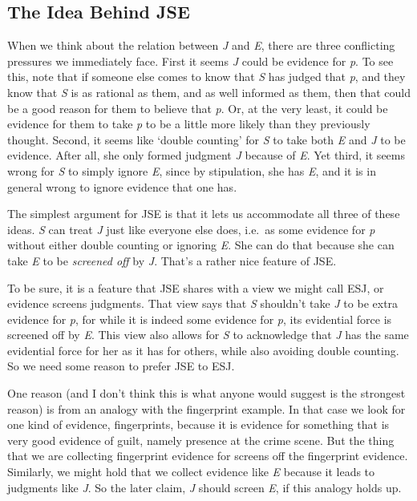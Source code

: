 \documentclass[
  11pt,
  letterpaper,
  DIV=11,
  numbers=noendperiod,
  twoside]{scrartcl}
\begin{document}
\subsection{The Idea Behind JSE}\label{the-idea-behind-jse}

When we think about the relation between \emph{J} and \emph{E}, there
are three conflicting pressures we immediately face. First it seems
\emph{J} could be evidence for \emph{p}. To see this, note that if
someone else comes to know that \emph{S} has judged that \emph{p}, and
they know that \emph{S} is as rational as them, and as well informed as
them, then that could be a good reason for them to believe that
\emph{p}. Or, at the very least, it could be evidence for them to take
\emph{p} to be a little more likely than they previously thought.
Second, it seems like `double counting' for \emph{S} to take both
\emph{E} and \emph{J} to be evidence. After all, she only formed
judgment \emph{J} because of \emph{E}. Yet third, it seems wrong for
\emph{S} to simply ignore \emph{E}, since by stipulation, she has
\emph{E}, and it is in general wrong to ignore evidence that one has.

The simplest argument for JSE is that it lets us accommodate all three
of these ideas. \emph{S} can treat \emph{J} just like everyone else
does, i.e.~as some evidence for \emph{p} without either double counting
or ignoring \emph{E}. She can do that because she can take \emph{E} to
be \emph{screened off} by \emph{J}. That's a rather nice feature of JSE.

To be sure, it is a feature that JSE shares with a view we might call
ESJ, or evidence screens judgments. That view says that \emph{S}
shouldn't take \emph{J} to be extra evidence for \emph{p}, for while it
is indeed some evidence for \emph{p}, its evidential force is screened
off by \emph{E}. This view also allows for \emph{S} to acknowledge that
\emph{J} has the same evidential force for her as it has for others,
while also avoiding double counting. So we need some reason to prefer
JSE to ESJ.

One reason (and I don't think this is what anyone would suggest is the
strongest reason) is from an analogy with the fingerprint example. In
that case we look for one kind of evidence, fingerprints, because it is
evidence for something that is very good evidence of guilt, namely
presence at the crime scene. But the thing that we are collecting
fingerprint evidence for screens off the fingerprint evidence.
Similarly, we might hold that we collect evidence like \emph{E} because
it leads to judgments like \emph{J}. So the later claim, \emph{J} should
screen \emph{E}, if this analogy holds up.
\end{document}
